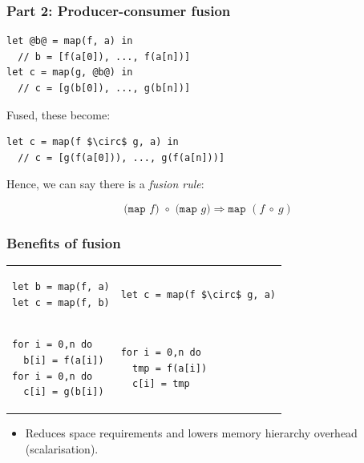 \documentclass[rgb,dvipsnames]{beamer}
\begin{document}
\begin{frame}[fragile]
  \frametitle{Part 2: Producer-consumer fusion}

\begin{lstlisting}
let @b@ = map(f, a) in
  // b = [f(a[0]), ..., f(a[n])]
let c = map(g, @b@) in
  // c = [g(b[0]), ..., g(b[n])]
\end{lstlisting}

Fused, these become:

\begin{lstlisting}[mathescape]
let c = map(f $\circ$ g, a) in
  // c = [g(f(a[0])), ..., g(f(a[n]))]
\end{lstlisting}

Hence, we can say there is a \textit{fusion rule}:

\[
\texttt{(map~$f$)~$\circ$~(map~$g$)} \Rightarrow \texttt{map~$(f~\circ~g)$}
\]

\end{frame}

\begin{frame}[fragile]
  \frametitle{Benefits of fusion}

  \begin{tabular}{p{}|p{}}
\begin{lstlisting}
let b = map(f, a)
let c = map(f, b)
\end{lstlisting}
    &
\begin{lstlisting}[mathescape]
let c = map(f $\circ$ g, a)
\end{lstlisting}
\\
\begin{lstlisting}
for i = 0,n do
  b[i] = f(a[i])
for i = 0,n do
  c[i] = g(b[i])
\end{lstlisting}
&
\begin{lstlisting}
for i = 0,n do
  tmp = f(a[i])
  c[i] = tmp
\end{lstlisting}
\end{tabular}

  \begin{itemize}
  \item Reduces space requirements and lowers memory hierarchy
    overhead (scalarisation).
  \end{itemize}
\end{frame}
\end{document}
